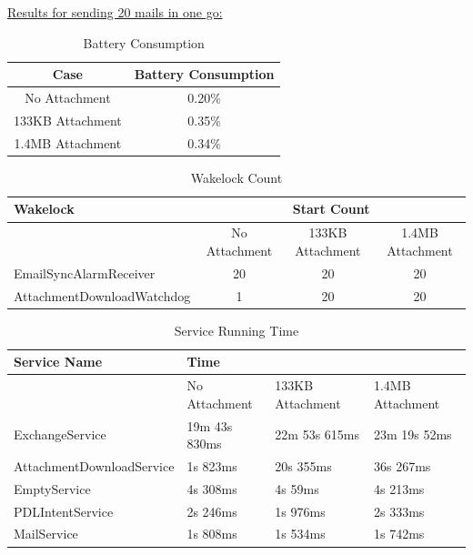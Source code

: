 \underline{Results for sending 20 mails in one go:} \\
\begin{table}[!h]
\centering
\caption{Battery Consumption}
\begin{tabular}{|c|c|}
\hline
Case & Battery Consumption\\ \hline
No Attachment & 0.20\%\\ \hline
133KB Attachment & 0.35\% \\ \hline
1.4MB Attachment & 0.34\% \\ \hline 
\end{tabular}
\end{table}
\begin{table}[!h]
\centering
\caption{Wakelock Count}
\label{my-label}
\begin{tabular}{|l|c|c|c|}
\hline
Wakelock                            & \multicolumn{3}{c|}{Start Count}                    \\ \hline
                                    & No Attachment & 133KB Attachment & 1.4MB Attachment \\ \hline
EmailSyncAlarmReceiver              & 20            & 20               & 20               \\ \hline
AttachmentDownloadWatchdog & 1             & 20               & 20               \\ \hline
\end{tabular}
\end{table}
\begin{table}[!h]
\centering
\caption{Service Running Time}
\label{my-label}
\begin{tabular}{|l|l|l|l|}
\hline
Service Name              & \multicolumn{3}{P{10cm}|}{Time}                           \\ \hline
                          & No Attachment & 133KB Attachment & 1.4MB Attachment \\ \hline
ExchangeService           & 19m 43s 830ms & 22m 53s 615ms    & 23m 19s 52ms     \\ \hline
AttachmentDownloadService & 1s 823ms      & 20s 355ms        & 36s 267ms        \\ \hline
EmptyService              & 4s 308ms      & 4s 59ms          & 4s 213ms         \\ \hline
PDLIntentService          & 2s 246ms      & 1s 976ms         & 2s 333ms         \\ \hline
MailService               & 1s 808ms      & 1s 534ms         & 1s 742ms         \\ \hline
\end{tabular}
\end{table}


